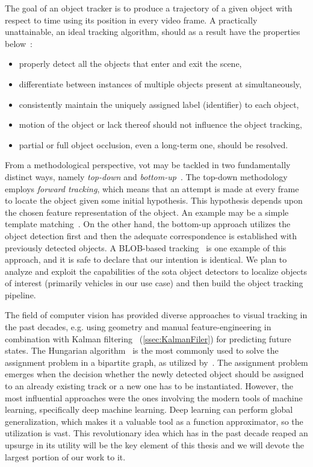 The goal of an object tracker is to produce a trajectory of a given object with respect to time using its position in every video frame. A practically unattainable, an ideal tracking algorithm, should as a result have the properties below~\cite{Jalal2012}:

\begin{itemize}
    \item properly detect all the objects that enter and exit the scene,
    \item differentiate between instances of multiple objects present at simultaneously,
    \item consistently maintain the uniquely assigned label (identifier) to each object,
    \item motion of the object or lack thereof should not influence the object tracking,
    \item partial or full object occlusion, even a long-term one, should be resolved.
\end{itemize}

From a methodological perspective, \gls{vot} may be tackled in two fundamentally distinct ways, namely \emph{top-down} and \emph{bottom-up}~\cite{Jalal2012}. The top-down methodology employs \emph{forward tracking}, which means that an attempt is made at every frame to locate the object given some initial hypothesis. This hypothesis depends upon the chosen feature representation of the object. An example may be a simple template matching~\cite{comaniciu2003kernel}. On the other hand, the bottom-up approach utilizes the object detection first and then the adequate correspondence is established with previously detected objects. A BLOB-based tracking~\cite{wren1997pfinder} is one example of this approach, and it is safe to declare that our intention is identical. We plan to analyze and exploit the capabilities of the \gls{sota} object detectors to localize objects of interest (primarily vehicles in our use case) and then build the object tracking pipeline.

The field of computer vision has provided diverse approaches to visual tracking in the past decades, e.g. using geometry and manual feature-engineering in combination with Kalman filtering~\cite{Kalman1960} (\cref{ssec:KalmanFiler}) for predicting future states. The Hungarian algorithm~\cite{Kuhn55thehungarian} is the most commonly used to solve the assignment problem in a bipartite graph, as utilized by~\cite{Bewley2016}. The assignment problem emerges when the decision whether the newly detected object should be assigned to an already existing track or a new one has to be instantiated. However, the most influential approaches were the ones involving the modern tools of machine learning, specifically deep machine learning. Deep learning can perform global generalization, which makes it a valuable tool as a function approximator, so the utilization is vast. This revolutionary idea which has in the past decade reaped an upsurge in its utility will be the key element of this thesis and we will devote the largest portion of our work to it.

